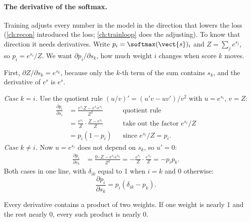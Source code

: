 \paragraph{The derivative of the softmax.} Training adjusts every number in the model in the
direction that lowers the loss (\cref{ch:recon} introduced the loss; \cref{ch:trainloop} does the
adjusting). To know that direction it needs derivatives. Write $p_i = \softmax(\vect{s})_i$ and
$Z = \sum_j e^{s_j}$, so $p_i = e^{s_i}/Z$. We want $\partial p_i / \partial s_k$, how much weight
$i$ changes when score $k$ moves.

First, $\partial Z / \partial s_k = e^{s_k}$, because only the $k$-th term of the sum contains
$s_k$, and the derivative of $e^{s}$ is $e^{s}$.

\emph{Case $k = i$.} Use the quotient rule $(u/v)' = (u'v - uv')/v^2$ with $u = e^{s_i}$,
$v = Z$:
\begin{align*}
  \frac{\partial p_i}{\partial s_i}
  &= \frac{e^{s_i} Z - e^{s_i} e^{s_i}}{Z^2} && \text{quotient rule}\\
  &= \frac{e^{s_i}}{Z}\cdot\frac{Z - e^{s_i}}{Z} && \text{take out the factor } e^{s_i}/Z\\
  &= p_i (1 - p_i) && \text{since } e^{s_i}/Z = p_i .
\end{align*}
\emph{Case $k \neq i$.} Now $u = e^{s_i}$ does not depend on $s_k$, so $u' = 0$:
\begin{align*}
  \frac{\partial p_i}{\partial s_k}
  &= \frac{0\cdot Z - e^{s_i} e^{s_k}}{Z^2} = -\frac{e^{s_i}}{Z}\cdot\frac{e^{s_k}}{Z} = -p_i p_k .
\end{align*}
Both cases in one line, with $\delta_{ik}$ equal to 1 when $i = k$ and 0 otherwise:
\begin{equation}\label{eq:attention:softmaxgrad}
  \frac{\partial p_i}{\partial s_k} = p_i(\delta_{ik} - p_k).
\end{equation}

Every derivative contains a product of two weights. If one weight is nearly 1 and the rest
nearly 0, every such product is nearly 0.

